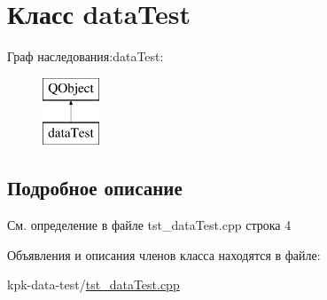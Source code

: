 \hypertarget{classdata_test}{}\section{Класс data\+Test}
\label{classdata_test}
Граф наследования\+:data\+Test\+:\begin{figure}[H]
\begin{center}
\leavevmode
\includegraphics[height=2.000000cm]{classdata_test}
\end{center}
\end{figure}


\subsection{Подробное описание}


См. определение в файле tst\+\_\+data\+Test.\+cpp строка 4



Объявления и описания членов класса находятся в файле\+:\begin{DoxyCompactItemize}
\item 
kpk-\/data-\/test/\hyperlink{tst__data_test_8cpp}{tst\+\_\+data\+Test.\+cpp}\end{DoxyCompactItemize}

